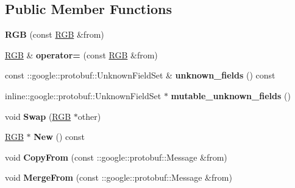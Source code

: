 \subsection*{Public Member Functions}
\begin{DoxyCompactItemize}
\item 
{\bfseries R\+GB} (const \hyperlink{classvss__state_1_1RGB}{R\+GB} \&from)\hypertarget{classvss__state_1_1RGB_ad057f22713ee486fa88d59661f15c390}{}\label{classvss__state_1_1RGB_ad057f22713ee486fa88d59661f15c390}

\item 
\hyperlink{classvss__state_1_1RGB}{R\+GB} \& {\bfseries operator=} (const \hyperlink{classvss__state_1_1RGB}{R\+GB} \&from)\hypertarget{classvss__state_1_1RGB_ae6850f3550d012f10cb3fe961ceca13a}{}\label{classvss__state_1_1RGB_ae6850f3550d012f10cb3fe961ceca13a}

\item 
const \+::google\+::protobuf\+::\+Unknown\+Field\+Set \& {\bfseries unknown\+\_\+fields} () const \hypertarget{classvss__state_1_1RGB_af3633b5c052c9b983f03dca86c5172e3}{}\label{classvss__state_1_1RGB_af3633b5c052c9b983f03dca86c5172e3}

\item 
inline\+::google\+::protobuf\+::\+Unknown\+Field\+Set $\ast$ {\bfseries mutable\+\_\+unknown\+\_\+fields} ()\hypertarget{classvss__state_1_1RGB_adfdaca9126b92f913d030d86975fb390}{}\label{classvss__state_1_1RGB_adfdaca9126b92f913d030d86975fb390}

\item 
void {\bfseries Swap} (\hyperlink{classvss__state_1_1RGB}{R\+GB} $\ast$other)\hypertarget{classvss__state_1_1RGB_a42f05e54d0dc837400c5079899b463aa}{}\label{classvss__state_1_1RGB_a42f05e54d0dc837400c5079899b463aa}

\item 
\hyperlink{classvss__state_1_1RGB}{R\+GB} $\ast$ {\bfseries New} () const \hypertarget{classvss__state_1_1RGB_a275dd9a86123627063addbde4feb117c}{}\label{classvss__state_1_1RGB_a275dd9a86123627063addbde4feb117c}

\item 
void {\bfseries Copy\+From} (const \+::google\+::protobuf\+::\+Message \&from)\hypertarget{classvss__state_1_1RGB_a7dca7dca78106990bae0191f4fc58aa3}{}\label{classvss__state_1_1RGB_a7dca7dca78106990bae0191f4fc58aa3}

\item 
void {\bfseries Merge\+From} (const \+::google\+::protobuf\+::\+Message \&from)\hypertarget{classvss__state_1_1RGB_a6b287c534b5414da22c85a7ace395032}{}\label{classvss__state_1_1RGB_a6b287c534b5414da22c85a7ace395032}


\end{DoxyCompactItemize}
